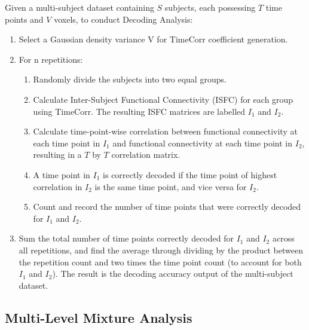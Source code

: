 \documentclass[12pt]{article}
\begin{document}
\normalsize
Given a multi-subject dataset containing $S$ subjects, each possessing $T$ time points and $V$ voxels, to conduct Decoding Analysis:
\begin{enumerate}
\item Select a Gaussian density variance V for TimeCorr coefficient generation.
\item For n repetitions:
\begin{enumerate}
\item Randomly divide the subjects into two equal groups.
\item Calculate Inter-Subject Functional Connectivity (ISFC) for each group using TimeCorr. The resulting ISFC matrices are labelled $I_1$ and $I_2$.
\item Calculate time-point-wise correlation between functional connectivity at each time point in $I_1$ and functional connectivity at each time point in $I_2$, resulting in a $T$ by $T$ correlation matrix.
\item A time point in $I_1$ is correctly decoded if the time point of highest correlation in $I_2$ is the same time point, and vice versa for $I_2$.
\item Count and record the number of time points that were correctly decoded for $I_1$ and $I_2$.
\end{enumerate}
\item Sum the total number of time points correctly decoded for $I_1$ and $I_2$ across all repetitions, and find the average through dividing by the product between the repetition count and two times the time point count (to account for both $I_1$ and $I_2$). The result is the decoding accuracy output of the multi-subject dataset.
\end{enumerate}

\subsection{Multi-Level Mixture Analysis}
\end{document}
